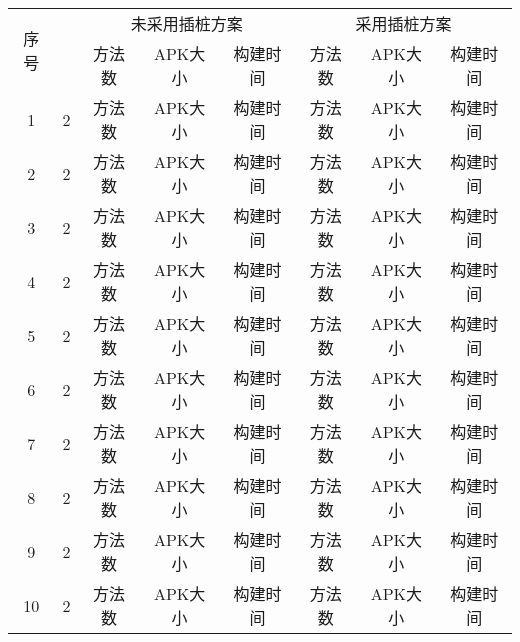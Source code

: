 {\begin{table*}[!ht]
{\begin{threeparttable}[b]
\begin{tabular}{|c|c|c|c|c|c|c|c|}
				\multirow{2}{0.03\linewidth}{序号}	&\multirow{2}{0.2\linewidth}{\centering{应用名}}& \multicolumn{3}{c}{未采用插桩方案}&  \multicolumn{3}{|c|}{采用插桩方案 }\\
				\cline{3-8}
				
				&	& 方法数 & APK大小 &	构建时间 &方法数 & APK大小 & 构建时间\\
				\hline
				
				1&	2   &方法数 & APK大小 &	构建时间 & 方法数 & APK大小 & 构建时间\\
				\hline
				2&	2   &方法数 & APK大小 &	构建时间 & 方法数 & APK大小 & 构建时间\\
				\hline
				3&	2    &方法数 & APK大小 &	构建时间 & 方法数 & APK大小 & 构建时间\\
				\hline
				4&	2    &方法数 & APK大小 &	构建时间 & 方法数 & APK大小 & 构建时间\\
				\hline
				5&	2    &方法数 & APK大小 &	构建时间 & 方法数 & APK大小 & 构建时间\\
				\hline		
				6&	2    &方法数 & APK大小 &	构建时间 & 方法数 & APK大小 & 构建时间\\
				\hline			
				7&	2    &方法数 & APK大小 &	构建时间 & 方法数 & APK大小 & 构建时间\\
				\hline		
				8&	2   &方法数 & APK大小 &	构建时间 & 方法数 & APK大小 & 构建时间\\
				\hline	
				9&	2   &方法数 & APK大小 &	构建时间 & 方法数 & APK大小 & 构建时间\\
				\hline	
				10&	2   &方法数 & APK大小 &	构建时间 & 方法数 & APK大小 & 构建时间\\
				\hline
				
				
				
			\end{tabular}
			
			
		\end{threeparttable}
	}
\end{table*}


}

